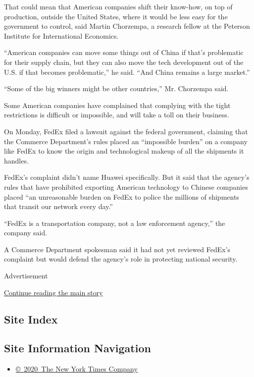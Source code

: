 That could mean that American companies shift their know-how, on top of
production, outside the United States, where it would be less easy for
the government to control, said Martin Chorzempa, a research fellow at
the Peterson Institute for International Economics.

``American companies can move some things out of China if that's
problematic for their supply chain, but they can also move the tech
development out of the U.S. if that becomes problematic,'' he said.
``And China remains a large market.''

``Some of the big winners might be other countries,'' Mr. Chorzempa
said.

Some American companies have complained that complying with the tight
restrictions is difficult or impossible, and will take a toll on their
business.

On Monday, FedEx filed a lawsuit against the federal government,
claiming that the Commerce Department's rules placed an ``impossible
burden'' on a company like FedEx to know the origin and technological
makeup of all the shipments it handles.

FedEx's complaint didn't name Huawei specifically. But it said that the
agency's rules that have prohibited exporting American technology to
Chinese companies placed ``an unreasonable burden on FedEx to police the
millions of shipments that transit our network every day.''

``FedEx is a transportation company, not a law enforcement agency,'' the
company said.

A Commerce Department spokesman said it had not yet reviewed FedEx's
complaint but would defend the agency's role in protecting national
security.

Advertisement

\protect\hyperlink{after-bottom}{Continue reading the main story}

\hypertarget{site-index}{%
\subsection{Site Index}\label{site-index}}

\hypertarget{site-information-navigation}{%
\subsection{Site Information
Navigation}\label{site-information-navigation}}

\begin{itemize}
\tightlist
\item
  \href{https://help.nytimes.com/hc/en-us/articles/115014792127-Copyright-notice}{©~2020~The
  New York Times Company}
\end{itemize}

